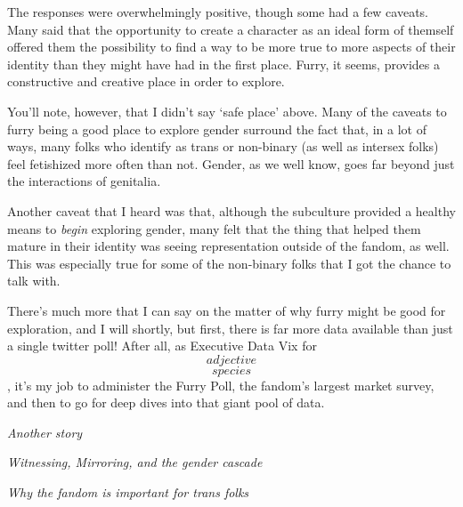 The responses were overwhelmingly positive, though some had a few caveats.  Many said that the opportunity to create a character as an ideal form of themself offered them the possibility to find a way to be more true to more aspects of their identity than they might have had in the first place.  Furry, it seems, provides a constructive and creative place in order to explore.

You'll note, however, that I didn't say `safe place' above.  Many of the caveats to furry being a good place to explore gender surround the fact that, in a lot of ways, many folks who identify as trans or non-binary (as well as intersex folks) feel fetishized more often than not.  Gender, as we well know, goes far beyond just the interactions of genitalia.

Another caveat that I heard was that, although the subculture provided a healthy means to \textit{begin} exploring gender, many felt that the thing that helped them mature in their identity was seeing representation outside of the fandom, as well.  This was especially true for some of the non-binary folks that I got the chance to talk with.

There's much more that I can say on the matter of why furry might be good for exploration, and I will shortly, but first, there is far more data available than just a single twitter poll!  After all, as Executive Data Vix for \[adjective\]\[species\], it's my job to administer the Furry Poll, the fandom's largest market survey, and then to go for deep dives into that giant pool of data.



\secdiv

\textit{Another story}

\secdiv

\textit{Witnessing, Mirroring, and the gender cascade}

\textit{Why the fandom is important for trans folks}
